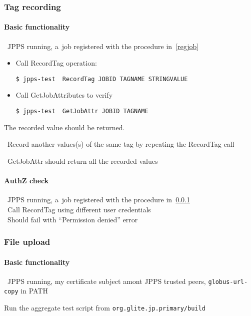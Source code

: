 \subsubsection{Tag recording}
\label{tagreg}

\paragraph{Basic functionality}
\req\
JPPS running, a~job registered with the procedure in~\ref{regjob}

\how 
\begin{itemize}
\item Call RecordTag operation:
\begin{verbatim}
$ jpps-test  RecordTag JOBID TAGNAME STRINGVALUE
\end{verbatim}
\item Call GetJobAttributes to verify
\begin{verbatim}
$ jpps-test  GetJobAttr JOBID TAGNAME
\end{verbatim}
\end{itemize}
\result
The recorded value should be returned.

\how\ Record another values(s) of the same tag by repeating the RecordTag call

\result\ GetJobAttr should return all the recorded values


\paragraph{AuthZ check}
\req\ JPPS running, a~job registered with the procedure in~\ref{tagreg} \\
\how\ Call RecordTag using different user credentials \\
\result\ Should fail with ``Permission denied'' error \\


\subsubsection{File upload}


\paragraph{Basic functionality}
\req\ JPPS running, my certificate subject amont JPPS trusted peers, 
\verb'globus-url-copy' in PATH

\how
Run the aggregate test script from \verb'org.glite.jp.primary/build'

